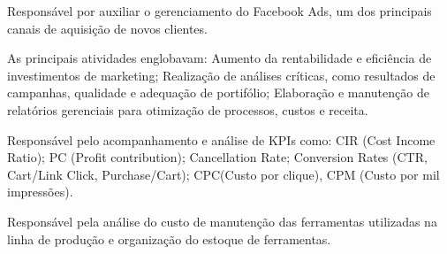 \documentclass[]{deedy-resume-openfont}
\begin{document}
\begin{minipage}[t]{0.52\textwidth}
\begin{tightemize}
\item Responsável por auxiliar o gerenciamento do Facebook Ads, um dos principais canais de aquisição de novos clientes.
\item As principais atividades englobavam: Aumento da rentabilidade e eficiência de investimentos de marketing; Realização de análises críticas, como resultados de campanhas, qualidade e adequação de portifólio; Elaboração e manutenção de relatórios gerenciais para otimização de processos, custos e receita. 
\item Responsável pelo acompanhamento e análise de KPIs como: CIR (Cost Income Ratio); PC (Profit contribution); Cancellation Rate; Conversion Rates (CTR, Cart/Link Click, Purchase/Cart); CPC(Custo por clique), CPM (Custo por mil impressões).
\end{tightemize}
\sectionsep

\begin{tightemize}
\item Responsável pela análise do custo de manutenção das ferramentas utilizadas na linha de produção e organização do estoque de ferramentas.
\end{tightemize}
\sectionsep


%
%

\end{minipage} 
\hfill
\end{document}
